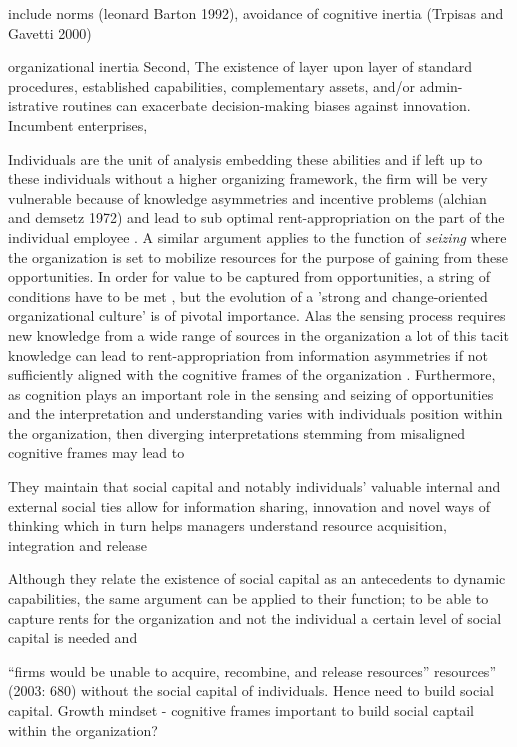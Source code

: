 include norms (leonard Barton 1992), avoidance of cognitive
inertia (Trpisas and Gavetti 2000)

organizational inertia
Second, 
The existence of layer upon layer of standard procedures, established capabilities, complementary assets, and/or admin- istrative routines can exacerbate decision-making biases against innovation. Incumbent enterprises,


Individuals are the unit of analysis embedding these abilities and if left up to
these individuals without a higher organizing framework, the firm will be very vulnerable
because of knowledge asymmetries and incentive problems (alchian and demsetz 1972) and
lead to sub optimal rent-appropriation on the part of the individual employee
\citep{Blyler2003}. A similar argument applies to the function of \emph{seizing} where the
organization is set to mobilize resources for the purpose of gaining from these
opportunities. In order for value to be captured from opportunities, a string of
conditions have to be met \citep{Teece2017}, but the evolution of a 'strong and
change-oriented organizational culture' \citep[p. 331]{Teece2014} is of pivotal
importance. Alas the sensing process requires new knowledge from a wide range of sources
in the organization a lot of this tacit knowledge can lead to rent-appropriation
from information asymmetries if not sufficiently aligned with the
cognitive frames of the organization \citep{Blyler2003}. Furthermore, as cognition plays
an important role in the sensing and seizing of opportunities \citep{Helfat2015} and the
interpretation and understanding varies with individuals position within the
organization, then diverging interpretations stemming from misaligned cognitive frames may
lead to 

They maintain that social capital and notably individuals’ valuable internal and external social ties allow for information sharing, innovation and novel ways of thinking which in turn helps managers understand resource acquisition, integration and release


Although they relate the existence of social capital
as an antecedents to dynamic capabilities, the same argument can be applied to their
function; to be able to capture rents for the organization and not the individual a
certain level of social capital is needed and 


“firms would be unable to acquire, recombine, and release resources”
resources” (2003: 680) without the social capital of individuals. Hence need to build
social capital. Growth mindset - cognitive frames important to build social captail within
the organization?



